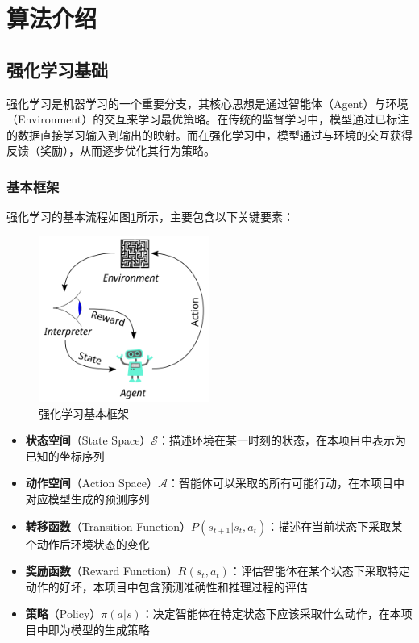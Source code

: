 \documentclass[a4paper, 12pt]{article}
\begin{document}
\section{算法介绍}
\subsection{强化学习基础}
强化学习是机器学习的一个重要分支，其核心思想是通过智能体（Agent）与环境（Environment）的交互来学习最优策略。在传统的监督学习中，模型通过已标注的数据直接学习输入到输出的映射。而在强化学习中，模型通过与环境的交互获得反馈（奖励），从而逐步优化其行为策略。

\subsubsection{基本框架}
强化学习的基本流程如图\ref{fig:rl_framework}所示，主要包含以下关键要素：

\begin{figure}[htbp]
    \centering
    \includegraphics[width=0.5\textwidth]{Images/RL.png}
    \caption{强化学习基本框架}
    \label{fig:rl_framework}
\end{figure}

\begin{itemize}
    \item \textbf{状态空间}（State Space）$\mathcal{S}$：描述环境在某一时刻的状态，在本项目中表示为已知的坐标序列
    \item \textbf{动作空间}（Action Space）$\mathcal{A}$：智能体可以采取的所有可能行动，在本项目中对应模型生成的预测序列
    \item \textbf{转移函数}（Transition Function）$P(s_{t+1}|s_t,a_t)$：描述在当前状态下采取某个动作后环境状态的变化
    \item \textbf{奖励函数}（Reward Function）$R(s_t,a_t)$：评估智能体在某个状态下采取特定动作的好坏，本项目中包含预测准确性和推理过程的评估
    \item \textbf{策略}（Policy）$\pi(a|s)$：决定智能体在特定状态下应该采取什么动作，在本项目中即为模型的生成策略
\end{itemize}
\end{document}
